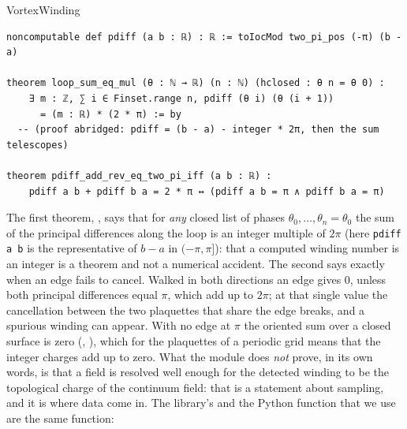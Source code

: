 \begin{leanbox}{VortexWinding}
\begin{lstlisting}[style=lean]
noncomputable def pdiff (a b : ℝ) : ℝ := toIocMod two_pi_pos (-π) (b - a)

theorem loop_sum_eq_mul (θ : ℕ → ℝ) (n : ℕ) (hclosed : θ n = θ 0) :
    ∃ m : ℤ, ∑ i ∈ Finset.range n, pdiff (θ i) (θ (i + 1))
      = (m : ℝ) * (2 * π) := by
  -- (proof abridged: pdiff = (b - a) - integer * 2π, then the sum telescopes)

theorem pdiff_add_rev_eq_two_pi_iff (a b : ℝ) :
    pdiff a b + pdiff b a = 2 * π ↔ (pdiff a b = π ∧ pdiff b a = π)
\end{lstlisting}
\end{leanbox}

The first theorem, , says that for \emph{any} closed list of phases $\theta_0,\dots,\theta_n=\theta_0$ the sum of the principal differences along the loop is an integer multiple of $2\pi$ (here \texttt{pdiff a b} is the representative of $b-a$ in $(-\pi,\pi]$): that a computed winding number is an integer is a theorem and not a numerical accident. The second says exactly when an edge fails to cancel. Walked in both directions an edge gives $0$, unless both principal differences equal $\pi$, which add up to $2\pi$; at that single value the cancellation between the two plaquettes that share the edge breaks, and a spurious winding can appear. With no edge at $\pi$ the oriented sum over a closed surface is zero (, ), which for the plaquettes of a periodic grid means that the integer charges add up to zero. What the module does \emph{not} prove, in its own words, is that a field is resolved well enough for the detected winding to be the topological charge of the continuum field: that is a statement about sampling, and it is where data come in. The library's  and the Python function that we use are the same function:

